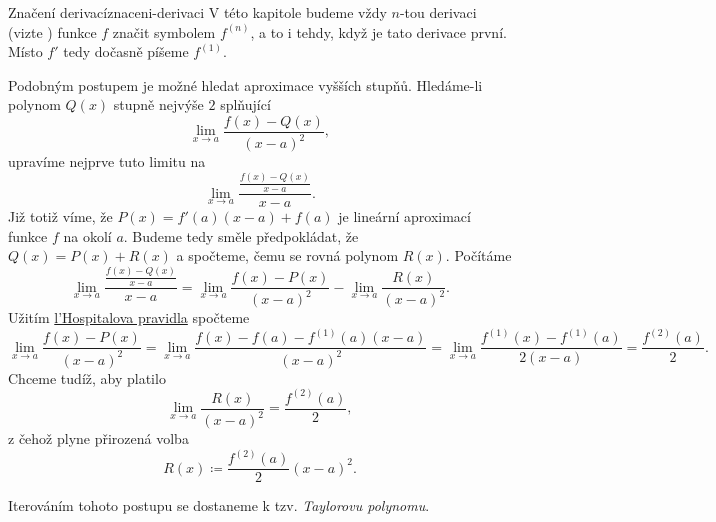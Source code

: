 \begin{remark}{Značení derivací}{znaceni-derivaci}
 V této kapitole budeme vždy $n$-tou derivaci (vizte
 ) funkce $f$ značit symbolem
 $f^{(n)}$, a to i tehdy, když je tato derivace první. Místo $f'$ tedy dočasně 
 píšeme $f^{(1)}$.
\end{remark}

Podobným postupem je možné hledat aproximace vyšších stupňů. Hledáme-li polynom
$Q(x)$ stupně nejvýše $2$ splňující
\[
 \lim_{x \to a} \frac{f(x) - Q(x)}{(x-a)^2},
\]
upravíme nejprve tuto limitu na
\[
 \lim_{x \to a} \frac{\frac{f(x) - Q(x)}{x-a}}{x-a}.
\]
Již totiž víme, že $P(x) = f'(a)(x-a) + f(a)$ je lineární aproximací funkce $f$
na okolí $a$. Budeme tedy směle předpokládat, že $Q(x) = P(x) + R(x)$ a
spočteme, čemu se rovná polynom $R(x)$. Počítáme
\[
 \lim_{x \to a} \frac{\frac{f(x) - Q(x)}{x-a}}{x-a} = \lim_{x \to a} \frac{f(x)
 - P(x)}{(x-a)^2} - \lim_{x \to a} \frac{R(x)}{(x-a)^2}.
\]
Užitím \hyperref[thm:lhospitalovo-pravidlo]{l'Hospitalova pravidla} spočteme
\[
 \lim_{x \to a} \frac{f(x) - P(x)}{(x-a)^2} = \lim_{x \to a} \frac{f(x) - f(a) -
 f^{(1)}(a)(x-a)}{(x-a)^2} = \lim_{x \to a} \frac{f^{(1)}(x) -
f^{(1)}(a)}{2(x-a)} = \frac{f^{(2)}(a)}{2}.
\]
Chceme tudíž, aby platilo
\[
 \lim_{x \to a} \frac{R(x)}{(x-a)^2} = \frac{f^{(2)}(a)}{2},
\]
z čehož plyne přirozená volba
\[
 R(x) \coloneqq \frac{f^{(2)}(a)}{2}(x-a)^2.
\]

Iterováním tohoto postupu se dostaneme k tzv. \emph{Taylorovu polynomu}.



